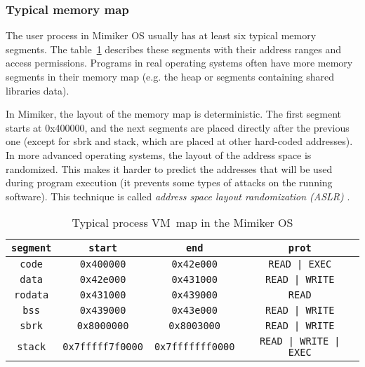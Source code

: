 \subsubsection{Typical memory map}

The user process in Mimiker OS usually has at least six typical memory segments.
The table~\ref{tab:vm_map} describes these segments with their address ranges and access permissions.
Programs in real operating systems often have more memory segments in their memory map
(e.g. the heap or segments containing shared libraries data).

In Mimiker, the layout of the memory map is deterministic.
The first segment starts at 0x400000, and the next segments are placed directly after the previous one
(except for sbrk and stack, which are placed at other hard-coded addresses).
In more advanced operating systems, the layout of the address space is randomized.
This makes it harder to predict the addresses that will be used during program execution
(it prevents some types of attacks on the running software).
This technique is called {\it address space layout randomization (ASLR)} \cite{tannenbaum}.

\begin{table}[b]
  \centering
  \begin{tabular}{|c|c|c|c|}
    \hline
    \texttt{segment} & \texttt{start}      & \texttt{end}       & \texttt{prot}         \\
    \hline
    \texttt{code}   & \texttt{0x400000}       & \texttt{0x42e000}       & \texttt{READ | EXEC}         \\
    \texttt{data}   & \texttt{0x42e000}       & \texttt{0x431000}       & \texttt{READ | WRITE}        \\
    \texttt{rodata} & \texttt{0x431000}       & \texttt{0x439000}       & \texttt{READ}                \\
    \texttt{bss}    & \texttt{0x439000}       & \texttt{0x43e000}       & \texttt{READ | WRITE}        \\
    \texttt{sbrk}   & \texttt{0x8000000}      & \texttt{0x8003000}      & \texttt{READ | WRITE}        \\
    \texttt{stack}  & \texttt{0x7fffff7f0000} & \texttt{0x7fffffff0000} & \texttt{READ | WRITE | EXEC} \\
    \hline
  \end{tabular}
  \caption{Typical process VM~map in the Mimiker OS}
  \label{tab:vm_map}
\end{table}

